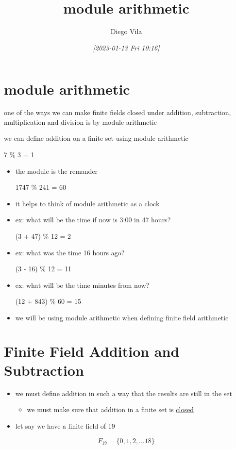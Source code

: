 \documentclass[11pt]{article}
\author{Diego Vila}
\date{\textit{[2023-01-13 Fri 10:16]}}
\title{module arithmetic}
\begin{document}
\maketitle
\tableofcontents


\section{module arithmetic}
\label{sec:org50501ef}
one of the ways we can make finite fields closed under addition, subtraction, multiplication and division
is by module arithmetic

we can define addition on a finite set using module arithmetic

7 \% 3 = 1

\begin{itemize}
\item the module is the remander

1747 \% 241 = 60

\item it helps to think of module arithmetic as a clock

\item ex:
what will be the time if now is 3:00 in 47 hours?

(3 + 47) \% 12 = 2

\item ex:
what was the time 16 hours ago?

(3 - 16) \% 12 = 11

\item ex:
what will be the time minutes from now?

(12 + 843) \% 60 = 15

\item we will be using module arithmetic when defining finite field arithmetic
\end{itemize}

\section{Finite Field Addition and Subtraction}
\label{sec:orgc61fd13}
\begin{itemize}
\item we must define addition in such a way that the results are still in the set
\begin{itemize}
\item we must make sure that addition in a finite set is \uline{closed}
\end{itemize}

\item let say we have a finite field of 19
\end{itemize}
\begin{equation*}
F_{19} = \{0,1,2, \dots 18\}
\end{equation*}
\end{document}
